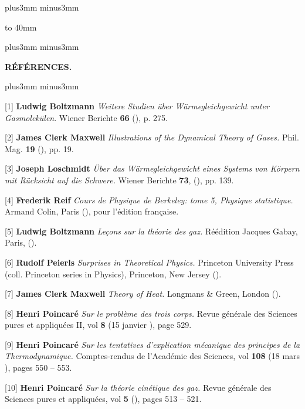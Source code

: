 \vskip8mm plus3mm minus3mm

\centerline{\hbox to 40mm{\hrulefill}}

\vskip12mm plus3mm minus3mm

\centerline{\bf R\'EF\'ERENCES.} 

\vskip8mm plus3mm minus3mm

[1] {\bf Ludwig Boltzmann} \hskip4mm {\it Weitere Studien \"uber 
W\"armegleichgewicht unter Gasmolek\"ulen}.  Wiener Berichte {\bf 66} 
({}), p. 275.
\medskip
\filbreak

[2]   {\bf James Clerk Maxwell} \hskip4mm {\it Illustrations of the 
Dynamical Theory of Gases.} {Phil. Mag.} {\bf 19} ({}), pp. 19.
\medskip
\filbreak

[3] {\bf Joseph Loschmidt} \hskip4mm {\it \"Uber das 
W\"arme\-gleich\-gewicht eines Systems von K\"orpern mit R\"ucksicht 
auf die Schwere.}  Wiener Berichte  {\bf 73}, 
({}), pp. 139.
\medskip
\filbreak

[4] {\bf Frederik Reif} \hskip4mm {\it Cours de Physique de Berkeley: 
tome 5, Physique statistique.} Armand Colin, Paris ({}),
pour l'\'edition fran\c{c}aise. 
\medskip
\filbreak

[5] {\bf Ludwig Boltzmann} \hskip4mm {\it Le\c{c}ons sur la th\'eorie 
des gaz.} R\'e\'edition Jacques Gabay, Paris, ({}).
\medskip
\filbreak

[6] {\bf Rudolf Peierls} \hskip4mm {\it Surprises in Theoretical Physics.} 
Princeton University Press (coll. Princeton series in Physics), 
Princeton, New Jersey ({}).
\medskip
\filbreak

[7] {\bf James Clerk Maxwell} \hskip4mm {\it Theory of Heat.} 
Longmans {\&} Green, London ({}).
\medskip
\filbreak

[8] {\bf Henri Poincar\'e} \hskip4mm {\it Sur le probl\`eme des trois 
corps.} Revue g\'en\'erale des Sciences pures et appliqu\'ees II, 
vol {\bf 8} (15 janvier {}), page 529.
\medskip
\filbreak

[9] {\bf Henri Poincar\'e} \hskip4mm {\it Sur les tentatives d'explication 
m\'ecanique des principes de la Thermodynamique.}  Comptes-rendus de 
l'Acad\'emie des Sciences, vol {\bf 108} (18 mars {}),
pages 550 -- 553. 
\medskip
\filbreak

[10] {\bf Henri Poincar\'e} \hskip4mm {\it Sur la th\'eorie cin\'etique 
des gaz.} Revue g\'en\'erale des Sciences pures et appliqu\'ees, 
vol {\bf 5} ({}), pages 513 -- 521.
\medskip
\filbreak

